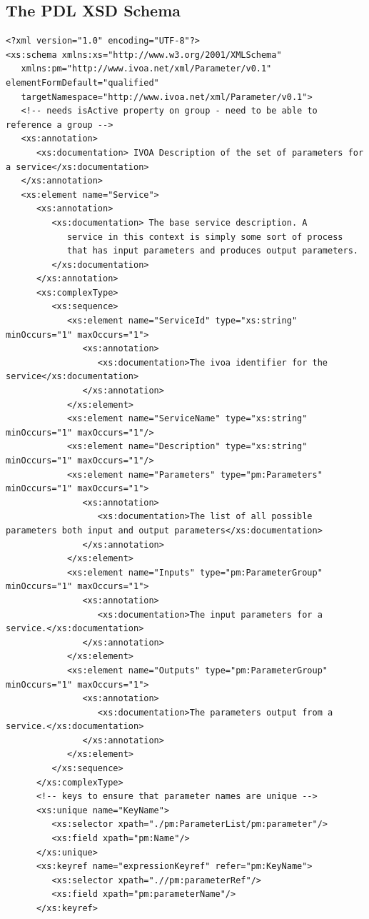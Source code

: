 \documentclass[a4paper,11pt] {ivoa}
\begin{document}
\subsection{The PDL XSD Schema}\label{pdlSchema}
\begin{lstlisting}
<?xml version="1.0" encoding="UTF-8"?>
<xs:schema xmlns:xs="http://www.w3.org/2001/XMLSchema"
   xmlns:pm="http://www.ivoa.net/xml/Parameter/v0.1" elementFormDefault="qualified"
   targetNamespace="http://www.ivoa.net/xml/Parameter/v0.1">
   <!-- needs isActive property on group - need to be able to reference a group -->
   <xs:annotation>
      <xs:documentation> IVOA Description of the set of parameters for a service</xs:documentation>
   </xs:annotation>
   <xs:element name="Service">
      <xs:annotation>
         <xs:documentation> The base service description. A
            service in this context is simply some sort of process
            that has input parameters and produces output parameters.
         </xs:documentation>
      </xs:annotation>
      <xs:complexType>
         <xs:sequence>
            <xs:element name="ServiceId" type="xs:string" minOccurs="1" maxOccurs="1">
               <xs:annotation>
                  <xs:documentation>The ivoa identifier for the service</xs:documentation>
               </xs:annotation>
            </xs:element>
            <xs:element name="ServiceName" type="xs:string" minOccurs="1" maxOccurs="1"/>
            <xs:element name="Description" type="xs:string" minOccurs="1" maxOccurs="1"/>
            <xs:element name="Parameters" type="pm:Parameters" minOccurs="1" maxOccurs="1">
               <xs:annotation>
                  <xs:documentation>The list of all possible parameters both input and output parameters</xs:documentation>
               </xs:annotation>
            </xs:element>
            <xs:element name="Inputs" type="pm:ParameterGroup" minOccurs="1" maxOccurs="1">
               <xs:annotation>
                  <xs:documentation>The input parameters for a service.</xs:documentation>
               </xs:annotation>
            </xs:element>
            <xs:element name="Outputs" type="pm:ParameterGroup" minOccurs="1" maxOccurs="1">
               <xs:annotation>
                  <xs:documentation>The parameters output from a service.</xs:documentation>
               </xs:annotation>
            </xs:element>
         </xs:sequence>
      </xs:complexType>
      <!-- keys to ensure that parameter names are unique -->
      <xs:unique name="KeyName">
         <xs:selector xpath="./pm:ParameterList/pm:parameter"/>
         <xs:field xpath="pm:Name"/>
      </xs:unique>
      <xs:keyref name="expressionKeyref" refer="pm:KeyName">
         <xs:selector xpath=".//pm:parameterRef"/>
         <xs:field xpath="pm:parameterName"/>
      </xs:keyref>


\end{lstlisting}
\end{document}
